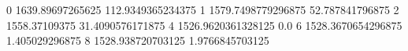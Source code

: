 0 1639.89697265625 112.9349365234375
1 1579.7498779296875 52.787841796875
2 1558.37109375 31.4090576171875
4 1526.9620361328125 0.0
6 1528.3670654296875 1.405029296875
8 1528.938720703125 1.9766845703125
